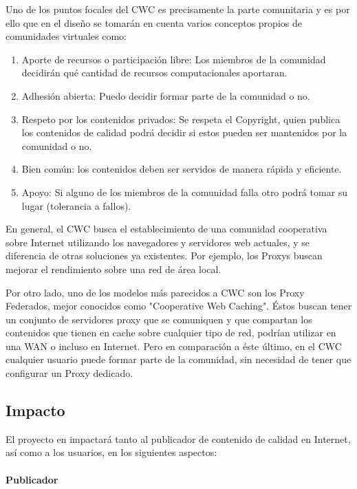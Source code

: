 Uno de los puntos focales del CWC es precisamente la parte comunitaria y es por ello que en el diseño se tomarán en cuenta varios conceptos propios de comunidades virtuales como: 

\begin{enumerate}
\item Aporte de recursos o participación libre: Los miembros de la comunidad decidirán qué cantidad de recursos computacionales aportaran.
\item Adhesión abierta: Puedo decidir formar parte de la comunidad o no.
\item Respeto por los contenidos privados: Se respeta el Copyright, quien publica los contenidos de calidad podrá decidir si estos pueden ser mantenidos por la comunidad o no.
\item Bien común: los contenidos deben ser servidos de manera rápida y eficiente.
\item Apoyo: Si alguno de los miembros de la comunidad falla otro podrá tomar su lugar (tolerancia a fallos).
\end{enumerate}

En general, el CWC busca el establecimiento de una comunidad cooperativa sobre Internet utilizando los navegadores y servidores web actuales, y se diferencia de otras soluciones ya existentes. Por ejemplo, los Proxys buscan mejorar el rendimiento sobre una red de área local. 

Por otro lado, uno de los modelos más parecidos a CWC son los Proxy Federados, mejor conocidos como "Cooperative Web Caching". Éstos buscan tener un conjunto de servidores proxy que se comuniquen y que compartan los contenidos que tienen en cache sobre cualquier tipo de red, podrían utilizar en una WAN o incluso en Internet. Pero en comparación a éste último, en el CWC cualquier usuario puede formar parte de la comunidad, sin necesidad de tener que configurar un Proxy dedicado.


\subsection{Impacto}


El proyecto en impactará tanto al publicador de contenido de calidad en Internet, así como a los usuarios, en los siguientes aspectos:

\paragraph{Publicador}


